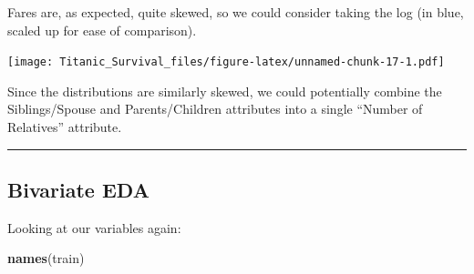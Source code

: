 \documentclass[]{article}
\newenvironment{Shaded}{\begin{snugshade}}{\end{snugshade}}
\newcommand{\KeywordTok}[1]{\textcolor[rgb]{0.13,0.29,0.53}{\textbf{#1}}}
\newcommand{\DataTypeTok}[1]{\textcolor[rgb]{0.13,0.29,0.53}{#1}}
\newcommand{\DecValTok}[1]{\textcolor[rgb]{0.00,0.00,0.81}{#1}}
\newcommand{\FloatTok}[1]{\textcolor[rgb]{0.00,0.00,0.81}{#1}}
\newcommand{\StringTok}[1]{\textcolor[rgb]{0.31,0.60,0.02}{#1}}
\newcommand{\OtherTok}[1]{\textcolor[rgb]{0.56,0.35,0.01}{#1}}
\newcommand{\OperatorTok}[1]{\textcolor[rgb]{0.81,0.36,0.00}{\textbf{#1}}}
\newcommand{\NormalTok}[1]{#1}
\begin{document}
Fares are, as expected, quite skewed, so we could consider taking the
log (in blue, scaled up for ease of comparison).

\begin{Shaded}
\end{Shaded}

\texttt{[image: Titanic\_Survival\_files/figure-latex/unnamed-chunk-17-1.pdf]}

Since the distributions are similarly skewed, we could potentially
combine the Siblings/Spouse and Parents/Children attributes into a
single ``Number of Relatives'' attribute.

\begin{center}\rule{0.5\linewidth}{\linethickness}\end{center}

\subsection{Bivariate EDA}\label{bivariate-eda}

Looking at our variables again:

\begin{Shaded}
\begin{Highlighting}[]
\KeywordTok{names}\NormalTok{(train)}
\end{Highlighting}
\end{Shaded}
\end{document}
